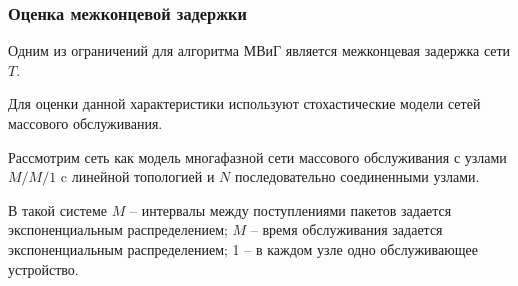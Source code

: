 \begin{frame}
    \justifying
    \frametitle{Оценка межконцевой задержки}
    \fontsize{8pt}{7.2}\selectfont

    Одним из ограничений для алгоритма МВиГ является межконцевая задержка сети $T$.
    \bigskip

    Для оценки данной характеристики используют стохастические модели сетей массового обслуживания.

    \bigskip

    {Рассмотрим сеть как модель многафазной сети массового обслуживания  с узлами $M/M/1$ c линейной топологией и $N$ последовательно соединенными узлами. 

    \bigskip

    В такой системе $M$ -- интервалы между поступлениями пакетов задается экспоненциальным распределением; $M$ --  время обслуживания задается экспоненциальным распределением; 1 -- в каждом узле одно обслуживающее устройство.}

   
\end{frame}

